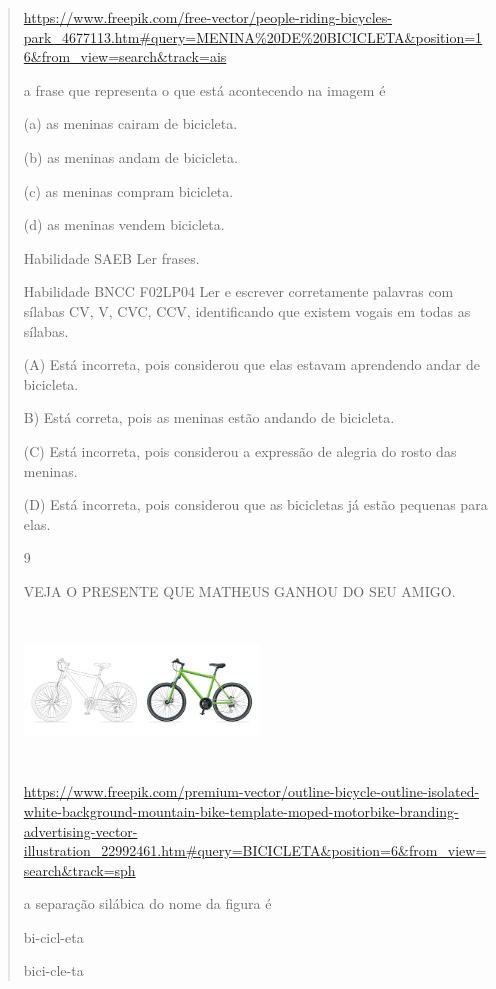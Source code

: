 \begin{verse}
{{{{{\url{https://www.freepik.com/free-vector/people-riding-bicycles-park_4677113.htm\#query=MENINA\%20DE\%20BICICLETA\&position=16\&from_view=search\&track=ais}

a frase que representa o que está acontecendo na imagem é

(a) as meninas cairam de bicicleta.

(b) as meninas andam de bicicleta.

(c) as meninas compram bicicleta.

(d) as meninas vendem bicicleta.

Habilidade SAEB Ler frases.

Habilidade BNCC F02LP04 Ler e escrever corretamente palavras com sílabas
CV, V, CVC, CCV, identificando que existem vogais em todas as sílabas.

(A) Está incorreta, pois considerou que elas estavam aprendendo andar de
bicicleta.

B) Está correta, pois as meninas estão andando de bicicleta.

(C) Está incorreta, pois considerou a expressão de alegria do rosto das
meninas.

(D) Está incorreta, pois considerou que as bicicletas já estão pequenas
para elas.

\num{9}

VEJA O PRESENTE QUE MATHEUS GANHOU DO SEU AMIGO.

\includegraphics[width=2.46250in,height=1.54444in]{media/image180.jpeg}

\url{https://www.freepik.com/premium-vector/outline-bicycle-outline-isolated-white-background-mountain-bike-template-moped-motorbike-branding-advertising-vector-illustration_22992461.htm\#query=BICICLETA\&position=6\&from_view=search\&track=sph}

a separação silábica do nome da figura é

\begin{escolha}
\item bi-cicl-eta

\item bici-cle-ta


\end{escolha}}}}}}
\end{verse}
